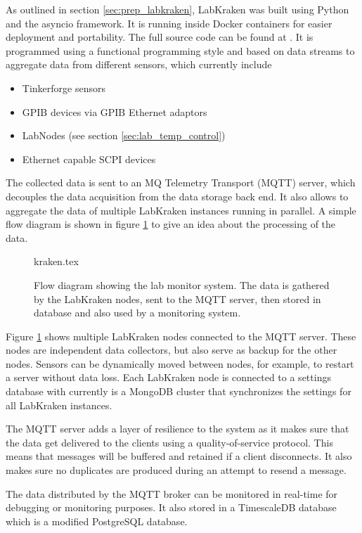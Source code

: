 As outlined in section \ref{sec:prep_labkraken}, LabKraken was built using Python and the asyncio framework. It is running inside Docker containers for easier deployment and portability. The full source code can be found at \cite{git_kraken}. It is programmed using a functional programming style and based on data streams to aggregate data from different sensors, which currently include
\begin{itemize}
    \item Tinkerforge sensors
    \item GPIB devices via GPIB Ethernet adaptors
    \item LabNodes (see section \ref{sec:lab_temp_control})
    \item Ethernet capable SCPI devices
\end{itemize}

The collected data is sent to an MQ Telemetry Transport (MQTT) server, which decouples the data acquisition from the data storage back end. It also allows to aggregate the data of multiple LabKraken instances running in parallel. A simple flow diagram is shown in figure \ref{fig:kraken_flow_diagram} to give an idea about the processing of the data.
\begin{figure}[ht]
    \centering
        {kraken.tex}
    \caption{Flow diagram showing the lab monitor system. The data is gathered by the LabKraken nodes, sent to the MQTT server, then stored in database and also used by a monitoring system.}
    \label{fig:kraken_flow_diagram}
\end{figure}

Figure \ref{fig:kraken_flow_diagram} shows multiple LabKraken nodes connected to the MQTT server. These nodes are independent data collectors, but also serve as backup for the other nodes. Sensors can be dynamically moved between nodes, for example, to restart a server without data loss. Each LabKraken node is connected to a settings database with currently is a MongoDB cluster that synchronizes the settings for all LabKraken instances.

The MQTT server adds a layer of resilience to the system as it makes sure that the data get delivered to the clients using a quality-of-service protocol. This means that messages will be buffered and retained if a client disconnects. It also makes sure no duplicates are produced during an attempt to resend a message.

The data distributed by the MQTT broker can be monitored in real-time for debugging or monitoring purposes. It also stored in a TimescaleDB database which is a modified PostgreSQL database.


